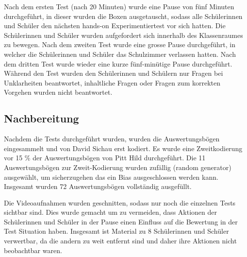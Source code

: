 Nach dem ersten Test (nach 20 Minuten) wurde eine Pause von fünf Minuten durchgeführt, in dieser wurden die Boxen ausgetauscht, sodass alle Schülerinnen und Schüler den nächsten hands-on Experimentiertest vor sich hatten. Die Schülerinnen und Schüler wurden aufgefordert sich innerhalb des Klassenraumes zu bewegen. Nach dem zweiten Test wurde eine grosse Pause durchgeführt, in welcher die Schülerinnen und Schüler das Schulzimmer verlassen hatten. Nach dem dritten Test wurde wieder eine kurze fünf-minütige Pause durchgeführt. Während den Test wurden den Schülerinnen und Schülern nur Fragen bei Unklarheiten beantwortet, inhaltliche Fragen oder Fragen zum korrekten Vorgehen wurden nicht beantwortet. 

\subsection{Nachbereitung}

Nachdem die Tests durchgeführt wurden, wurden die Auswertungsbögen eingesammelt und von David Sichau erst kodiert. Es wurde eine Zweitkodierung vor 15 \% der Auswertungsbögen von Pitt Hild durchgeführt. Die 11 Auswertungsbögen zur Zweit-Kodierung wurden zufällig (random generator) ausgewählt, um sicherzugehen das ein Bias ausgeschlossen werden kann. Insgesamt wurden 72 Auswertungsbögen vollständig ausgefüllt. 

Die Videoaufnahmen wurden geschnitten, sodass nur noch die einzelnen Tests sichtbar sind. Dies wurde gemacht um zu vermeiden, dass Aktionen der Schülerinnen und Schüler in der Pause einen Einfluss auf die Bewertung in der Test Situation haben. Insgesamt ist Material zu 8 Schülerinnen und Schüler verwertbar, da die andern zu weit entfernt sind und daher ihre Aktionen nicht beobachtbar waren.

